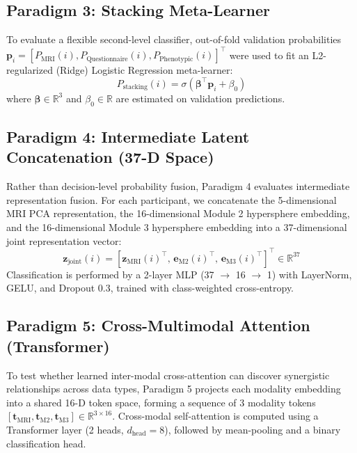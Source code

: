 \documentclass[10pt,letterpaper]{article}
\begin{document}
        \subsection*{Paradigm 3: Stacking Meta-Learner}
        To evaluate a flexible second-level classifier, out-of-fold validation probabilities $\mathbf{p}_i = [P_{\text{MRI}}(i), P_{\text{Questionnaire}}(i), P_{\text{Phenotypic}}(i)]^\top$ were used to fit an L2-regularized (Ridge) Logistic Regression meta-learner:
        \begin{equation} \label{eq:stacking}
        P_{\text{stacking}}(i) = \sigma(\boldsymbol{\beta}^\top \mathbf{p}_i + \beta_0)
        \end{equation}
        where $\boldsymbol{\beta} \in \mathbb{R}^3$ and $\beta_0 \in \mathbb{R}$ are estimated on validation predictions.

        \subsection*{Paradigm 4: Intermediate Latent Concatenation (37-D Space)}
        Rather than decision-level probability fusion, Paradigm 4 evaluates intermediate representation fusion. For each participant, we concatenate the 5-dimensional MRI PCA representation, the 16-dimensional Module 2 hypersphere embedding, and the 16-dimensional Module 3 hypersphere embedding into a 37-dimensional joint representation vector:
        \begin{equation} \label{eq:latent_concat}
        \mathbf{z}_{\text{joint}}(i) = [\mathbf{z}_{\text{MRI}}(i)^\top,\, \mathbf{e}_{\text{M2}}(i)^\top,\, \mathbf{e}_{\text{M3}}(i)^\top]^\top \in \mathbb{R}^{37}
        \end{equation}
        Classification is performed by a 2-layer MLP (37 $\to$ 16 $\to$ 1) with LayerNorm, GELU, and Dropout 0.3, trained with class-weighted cross-entropy.

        \subsection*{Paradigm 5: Cross-Multimodal Attention (Transformer)}
        To test whether learned inter-modal cross-attention can discover synergistic relationships across data types, Paradigm 5 projects each modality embedding into a shared 16-D token space, forming a sequence of 3 modality tokens $[\mathbf{t}_{\text{MRI}}, \mathbf{t}_{\text{M2}}, \mathbf{t}_{\text{M3}}] \in \mathbb{R}^{3 \times 16}$. Cross-modal self-attention is computed using a Transformer layer (2 heads, $d_{\text{head}} = 8$), followed by mean-pooling and a binary classification head.
\end{document}
